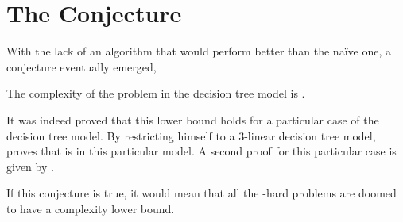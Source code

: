 \section{The Conjecture}

With the lack of an algorithm that would perform better than the naïve
 one, a conjecture eventually emerged,

\begin{conjecture}
The complexity of the \threeSUM problem in the decision tree model is
.
\end{conjecture}

It was indeed proved that this lower bound holds for a particular case of the
decision tree model. By restricting himself to a $3$-linear decision tree
model, \citet{erickson:1999} proves that \threeSUM is  in this
particular model. A second proof for this particular case is given by
\citet{ailon:2005}.

If this conjecture is true, it would mean that all the \threeSUM-hard
problems are doomed to have a  complexity lower bound.

